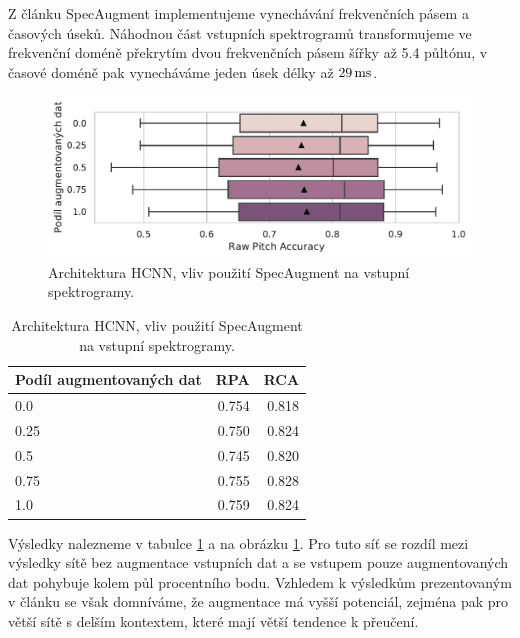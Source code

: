 Z článku SpecAugment implementujeme vynechávání frekvenčních pásem a časových úseků. Náhodnou část vstupních spektrogramů transformujeme ve frekvenční doméně překrytím dvou frekvenčních pásem šířky až 5.4 půltónu, v časové doméně pak vynecháváme jeden úsek délky až $29\,\rm ms$.

\begin{figure}[h]\centering
    \includegraphics[scale=0.6]{../img/figures/spectrogram_specaugment}
\caption{Architektura HCNN, vliv použití SpecAugment na vstupní spektrogramy.}\label{obr:hcnn_specaugment}
\end{figure}

\begin{table}[h!]
\centering
    \begin{tabular}{lrr}
    \toprule
    Podíl augmentovaných dat &   RPA &   RCA \\
    \midrule
                        0.0 & 0.754 & 0.818 \\
                        0.25 & 0.750 & 0.824 \\
                        0.5 & 0.745 & 0.820 \\
                        0.75 & 0.755 & 0.828 \\
                        1.0 & 0.759 & 0.824 \\
    \bottomrule
    \end{tabular}
\caption{Architektura HCNN, vliv použití SpecAugment na vstupní spektrogramy.}\label{tab:hcnn_specaugment}
\end{table}


Výsledky nalezneme v tabulce \ref{tab:hcnn_specaugment} a na obrázku \ref{obr:hcnn_specaugment}. Pro tuto síť se rozdíl mezi výsledky sítě bez augmentace vstupních dat a se vstupem pouze augmentovaných dat pohybuje kolem půl procentního bodu. Vzhledem k výsledkům prezentovaným v článku \cite{Park2019} se však domníváme, že augmentace má vyšší potenciál, zejména pak pro větší sítě s delším kontextem, které mají větší tendence k přeučení.

